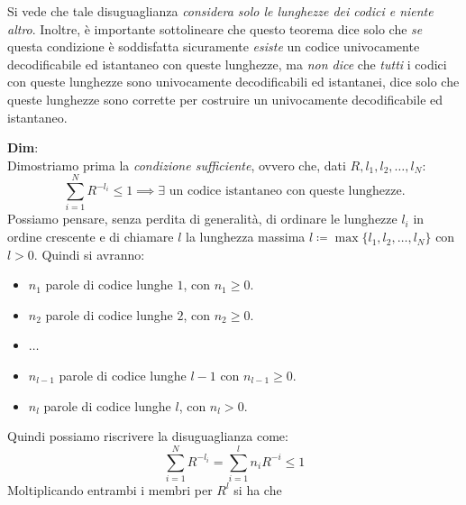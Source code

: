 Si vede  che  tale  disuguaglianza \textit{considera solo le lunghezze dei codici e niente  altro}. Inoltre, è importante sottolineare  che questo  teorema  dice  solo  che  \textit{se}  questa  condizione  è  soddisfatta sicuramente  \textit{esiste}  un codice univocamente  decodificabile ed istantaneo con queste lunghezze, ma \textit{non dice} che \textit{tutti} i codici con queste lunghezze  sono univocamente  decodificabili  ed istantanei, dice solo che  queste  lunghezze  sono corrette per costruire un univocamente decodificabile ed istantaneo.
\begin{tcolorbox}
\textbf{Dim}: \\
Dimostriamo prima la \textit{condizione sufficiente}, ovvero che, dati $R, l_1, l_2, \dots, l_N$:
\begin{equation*}
    \sum_{i=1}^N R^{-l_i} \leq 1 \implies \exists \text{ un codice istantaneo con queste lunghezze.}
\end{equation*}
Possiamo pensare, senza perdita di generalit\`a, di ordinare le lunghezze $l_i$ in ordine crescente e di chiamare $l$ la lunghezza massima $l \coloneqq \max \{l_1, l_2, \dots, l_N\}$ con $l > 0$. Quindi si avranno:
\begin{itemize}
    \item $n_1$ parole di codice lunghe $1$, con $n_1 \geq 0$.
    \item  $n_2$ parole di codice lunghe $2$, con $n_2 \geq 0$.
    \item $\dots$
    \item $n_{l-1}$ parole di codice lunghe $l-1$ con $n_{l-1} \geq 0$.
    \item $n_l$ parole di codice lunghe $l$, con $n_l > 0$.
\end{itemize}
Quindi possiamo riscrivere la disuguaglianza come:
\begin{equation*}
    \sum_{i=1}^N R^{-l_i} = \sum_{i=1}^{l} n_i R^{-i} \leq 1
\end{equation*}
Moltiplicando entrambi i membri per $R^l$ si ha che
\end{tcolorbox}
